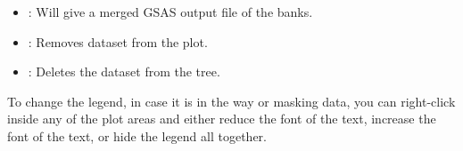 \begin{itemize}
\item {}: Will give a merged GSAS output file of the banks.
\item {}: Removes dataset from the plot.
\item {}: Deletes the dataset from the  tree.

\end{itemize}

To change the legend, in case it is in the way or masking data, you can right-click inside any of the plot areas and either reduce the font of the text, increase the font of the text, or hide the legend all together.



